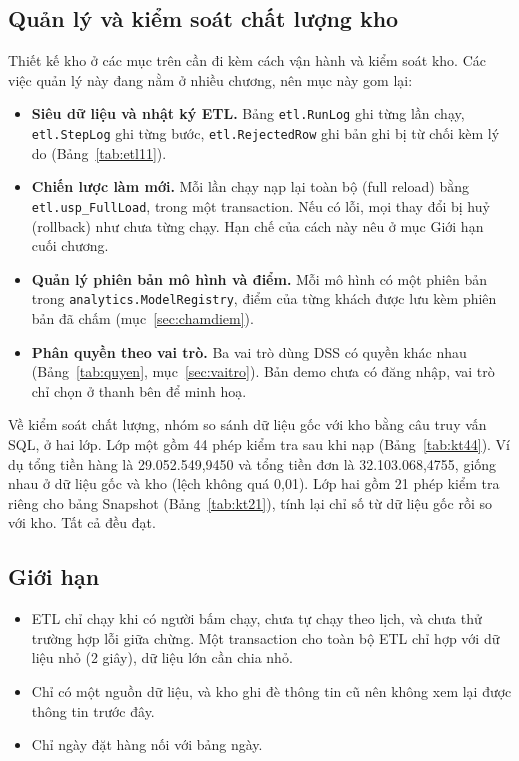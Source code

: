 \subsection{Quản lý và kiểm soát chất lượng kho}
Thiết kế kho ở các mục trên cần đi kèm cách vận hành và kiểm soát kho. Các việc quản lý này đang nằm ở nhiều chương, nên mục này gom lại:
\begin{itemize}
    \item \textbf{Siêu dữ liệu và nhật ký ETL.} Bảng \texttt{etl.RunLog} ghi từng lần chạy, \texttt{etl.StepLog} ghi từng bước, \texttt{etl.RejectedRow} ghi bản ghi bị từ chối kèm lý do (Bảng~\ref{tab:etl11}).
    \item \textbf{Chiến lược làm mới.} Mỗi lần chạy nạp lại toàn bộ (full reload) bằng \texttt{etl.usp\_\allowbreak FullLoad}, trong một transaction. Nếu có lỗi, mọi thay đổi bị huỷ (rollback) như chưa từng chạy. Hạn chế của cách này nêu ở mục Giới hạn cuối chương.
    \item \textbf{Quản lý phiên bản mô hình và điểm.} Mỗi mô hình có một phiên bản trong \texttt{analytics.\allowbreak ModelRegistry}, điểm của từng khách được lưu kèm phiên bản đã chấm (mục~\ref{sec:chamdiem}).
    \item \textbf{Phân quyền theo vai trò.} Ba vai trò dùng DSS có quyền khác nhau (Bảng~\ref{tab:quyen}, mục~\ref{sec:vaitro}). Bản demo chưa có đăng nhập, vai trò chỉ chọn ở thanh bên để minh hoạ.
\end{itemize}
Về kiểm soát chất lượng, nhóm so sánh dữ liệu gốc với kho bằng câu truy vấn SQL, ở hai lớp. Lớp một gồm 44 phép kiểm tra sau khi nạp (Bảng~\ref{tab:kt44}). Ví dụ tổng tiền hàng là 29.052.549,9450 và tổng tiền đơn là 32.103.068,4755, giống nhau ở dữ liệu gốc và kho (lệch không quá 0,01). Lớp hai gồm 21 phép kiểm tra riêng cho bảng Snapshot (Bảng~\ref{tab:kt21}), tính lại chỉ số từ dữ liệu gốc rồi so với kho. Tất cả đều đạt.

\begin{table}[H]
\centering
\caption{Kết quả 44 phép kiểm tra sau khi nạp kho}
\label{tab:kt44}
\footnotesize

\end{table}

\begin{table}[H]
\centering
\caption{Kết quả 21 phép kiểm tra bảng Customer Snapshot}
\label{tab:kt21}
\footnotesize

\end{table}

\subsection{Giới hạn}
\begin{itemize}
    \item ETL chỉ chạy khi có người bấm chạy, chưa tự chạy theo lịch, và chưa thử trường hợp lỗi giữa chừng. Một transaction cho toàn bộ ETL chỉ hợp với dữ liệu nhỏ (2 giây), dữ liệu lớn cần chia nhỏ.
    \item Chỉ có một nguồn dữ liệu, và kho ghi đè thông tin cũ nên không xem lại được thông tin trước đây.
    \item Chỉ ngày đặt hàng nối với bảng ngày.
\end{itemize}
